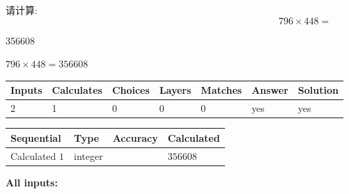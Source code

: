 \documentclass{ctexart}
\begin{document}
  
 
请计算:
\begin{equation}
796  \times    %
448 = \nonumber
\end{equation}
 
 
 
\noindent{}
 
 

356608
 
 
\noindent{}
 
 

 
 
 
\noindent{}
 
 

$ %
796 \times  %
448=   %
356608$
 
 
\noindent{}
 
 

 
   
   
   
   
\noindent\begin{tabular}{|l|l|l|l|l|l|l|}
 \hline
Inputs & Calculates & Choices & Layers & Matches & Answer & Solution \\ \hline
 2  & 
 1  & 
 0
  & 
 0  & 
 0  & 
  yes & 
  yes 
  \\ \hline
 \end{tabular}
   
   
   
   
\noindent{}
   
   
  
  
\noindent\begin{tabular}{|l|l|l|l|}
\hline
 Sequential & Type & Accuracy & Calculated \\ 
\hline
 
 
  Calculated $  1 $ & integer &  & 
  $ 356608 $ 
 \\  \hline  
 \end{tabular}
   
   
   
   
\noindent\vspace{0.1in}\hspace{-0.08in} {\textbf{\Large{All inputs: }}}
   
\end{document}

